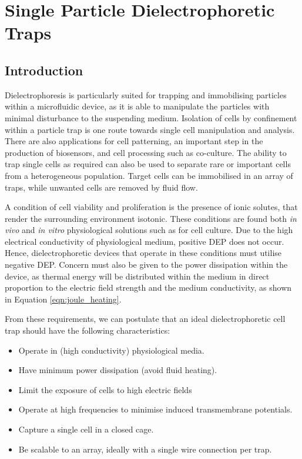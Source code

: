 \chapter{Single Particle Dielectrophoretic Traps}
\label{Chapter:Ring_traps_1}

\section{Introduction}
Dielectrophoresis is particularly suited for trapping and immobilising particles within a microfluidic device, as it is able to manipulate the particles with minimal disturbance to the suspending medium. Isolation of cells by confinement within a particle trap is one route towards single cell manipulation and analysis. There are also applications for cell patterning, an important step in the production of biosensors, and cell processing such as co-culture. The ability to trap single cells as required can also be used to separate rare or important cells from a heterogeneous population. Target cells can be immobilised in an array of traps, while unwanted cells are removed by fluid flow.

A condition of cell viability and proliferation is the presence of ionic solutes, that render the surrounding environment isotonic. These conditions are found both \textit{in vivo} and \textit{in vitro} physiological solutions such as for cell culture. Due to the high electrical conductivity of physiological medium, positive DEP does not occur. Hence, dielectrophoretic devices that operate in these conditions must utilise negative DEP. Concern must also be given to the power dissipation within the device, as thermal energy will be distributed within the medium in direct proportion to the electric field strength and the medium conductivity, as shown in Equation \ref{eqn:joule_heating}.

From these requirements, we can postulate that an ideal dielectrophoretic cell trap should have the following characteristics:
\begin{itemize}
	\item Operate in (high conductivity) physiological media.
	\item Have minimum power dissipation (avoid fluid heating).
	\item Limit the exposure of cells to high electric fields
	\item Operate at high frequencies to minimise induced transmembrane potentials.
	\item Capture a single cell in a closed cage.
	\item Be scalable to an array, ideally with a single wire connection per trap.
\end{itemize}

